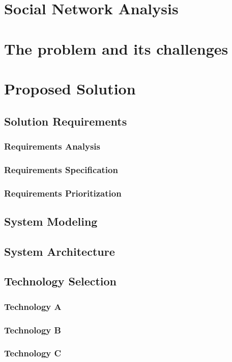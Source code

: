 \documentclass[
  oneside,
  11pt, a4paper,
  footinclude=true,
  headinclude=true,
  cleardoublepage=empty
]{scrbook}
\begin{document}
	\chapter{Social Network Analysis}
	


	\chapter{The problem and its challenges}


	\chapter{Proposed Solution}
	\section{Solution Requirements}
	\subsection{Requirements Analysis}
	\subsection{Requirements Specification}
	\subsection{Requirements Prioritization}
	\section{System Modeling}
	\section{System Architecture}
	\section{Technology Selection}
	\subsection{Technology A}
	\subsection{Technology B}
	\subsection{Technology C}
\end{document}
